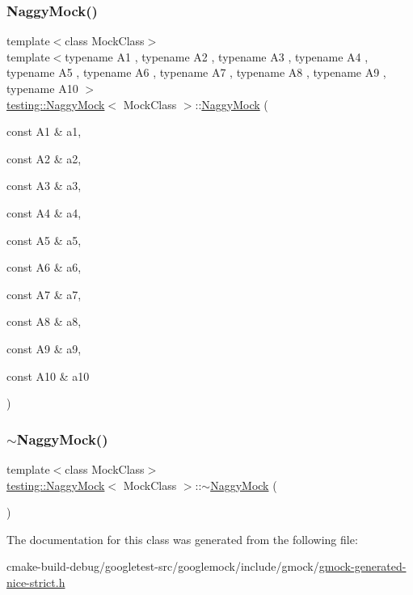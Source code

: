 \subsubsection{\texorpdfstring{NaggyMock()}{NaggyMock()}\hspace{0.1cm}{\footnotesize\ttfamily [11/11]}}
{\footnotesize\ttfamily template$<$class Mock\+Class$>$ \\
template$<$typename A1 , typename A2 , typename A3 , typename A4 , typename A5 , typename A6 , typename A7 , typename A8 , typename A9 , typename A10 $>$ \\
\mbox{\hyperlink{classtesting_1_1NaggyMock}{testing\+::\+Naggy\+Mock}}$<$ Mock\+Class $>$\+::\mbox{\hyperlink{classtesting_1_1NaggyMock}{Naggy\+Mock}} (\begin{DoxyParamCaption}\item[{const A1 \&}]{a1,  }\item[{const A2 \&}]{a2,  }\item[{const A3 \&}]{a3,  }\item[{const A4 \&}]{a4,  }\item[{const A5 \&}]{a5,  }\item[{const A6 \&}]{a6,  }\item[{const A7 \&}]{a7,  }\item[{const A8 \&}]{a8,  }\item[{const A9 \&}]{a9,  }\item[{const A10 \&}]{a10 }\end{DoxyParamCaption})\hspace{0.3cm}{\ttfamily [inline]}}

\mbox{\label{classtesting_1_1NaggyMock_a9d00e4811942489b4c3cdd8e8c658518}} 
\subsubsection{\texorpdfstring{$\sim$NaggyMock()}{~NaggyMock()}}
{\footnotesize\ttfamily template$<$class Mock\+Class$>$ \\
\mbox{\hyperlink{classtesting_1_1NaggyMock}{testing\+::\+Naggy\+Mock}}$<$ Mock\+Class $>$\+::$\sim$\mbox{\hyperlink{classtesting_1_1NaggyMock}{Naggy\+Mock}} (\begin{DoxyParamCaption}{ }\end{DoxyParamCaption})\hspace{0.3cm}{\ttfamily [inline]}}



The documentation for this class was generated from the following file\+:\begin{DoxyCompactItemize}
\item 
cmake-\/build-\/debug/googletest-\/src/googlemock/include/gmock/\mbox{\hyperlink{gmock-generated-nice-strict_8h}{gmock-\/generated-\/nice-\/strict.\+h}}\end{DoxyCompactItemize}
